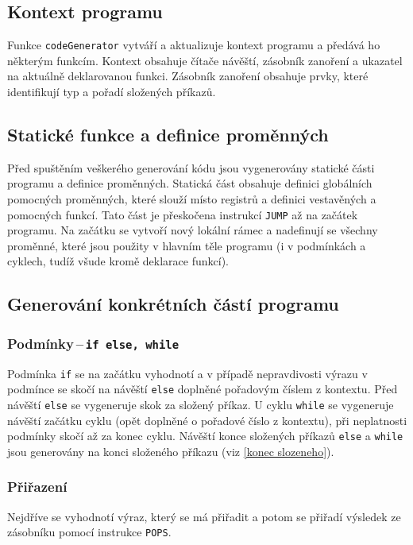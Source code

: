 \documentclass[a4paper, 12pt]{article}
\begin{document}
    \subsection{Kontext programu}
    Funkce \texttt{codeGenerator} vytváří a aktualizuje kontext programu a předává ho některým funkcím. Kontext obsahuje čítače návěští, zásobník zanoření a ukazatel na aktuálně deklarovanou funkci. Zásobník zanoření obsahuje prvky, které identifikují typ a pořadí složených příkazů.

    \subsection{Statické funkce a definice proměnných}
    Před spuštěním veškerého generování kódu jsou vygenerovány statické části programu a definice proměnných. Statická část obsahuje definici globálních pomocných proměnných, které slouží místo registrů a definici vestavěných a pomocných funkcí. Tato část je přeskočena instrukcí \texttt{JUMP} až na začátek programu. Na začátku se vytvoří nový lokální rámec a nadefinují se všechny proměnné, které jsou použity v hlavním těle programu (i v podmínkách a cyklech, tudíž všude kromě deklarace funkcí).

    \subsection{Generování konkrétních částí programu}

    \subsubsection{Podmínky\,--\,\texttt{if else, while}}
    Podmínka \texttt{if} se na začátku vyhodnotí a v případě nepravdivosti výrazu v podmínce se skočí na návěští \texttt{else} doplněné pořadovým číslem z kontextu. Před návěští \texttt{else} se vygeneruje skok za složený příkaz. U cyklu \texttt{while} se vygeneruje návěští začátku cyklu (opět doplněné o pořadové číslo z kontextu), při neplatnosti podmínky skočí až za konec cyklu. Návěští konce složených příkazů \texttt{else} a \texttt{while} jsou generovány na konci složeného příkazu (viz \ref{konec slozeneho}).

    \subsubsection{Přiřazení}
    Nejdříve se vyhodnotí výraz, který se má přiřadit a potom se přiřadí výsledek ze zásobníku pomocí instrukce \texttt{POPS}.
\end{document}
